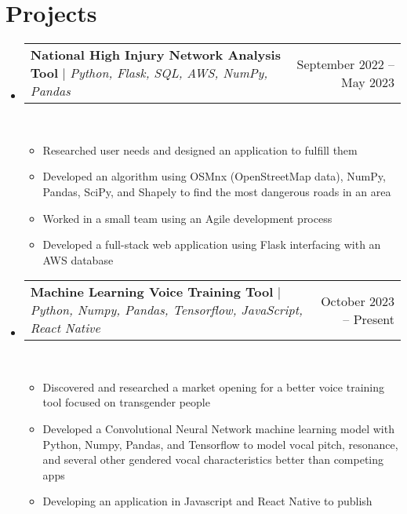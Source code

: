 \documentclass[a4paper,10pt]{article}
\makeatletter
\newcommand{\resumeItem}[1]{
  \item\small{
    {#1\vspace{-2pt}}
  }
}
\newcommand{\resumeProjectHeading}[2]{
    \item
    \begin{tabular*}{0.97\textwidth}{l@{\extracolsep{\fill}}r}
      \small#1 & #2 \\
    \end{tabular*}\vspace{-7pt}
}
\newcommand{\resumeSubHeadingListStart}{\begin{itemize}[leftmargin=0.15in, label={}]}
\newcommand{\resumeSubHeadingListEnd}{\end{itemize}}
\newcommand{\resumeItemListStart}{\begin{itemize}}
\newcommand{\resumeItemListEnd}{\end{itemize}\vspace{-5pt}}
\makeatother
\begin{document}
\section{Projects}
    \resumeSubHeadingListStart
      \resumeProjectHeading
          {\textbf{National High Injury Network Analysis Tool} $|$ \emph{Python, Flask, SQL, AWS, NumPy, Pandas}}{September 2022 -- May 2023}\\
          \resumeItemListStart
            \resumeItem{Researched user needs and designed an application to fulfill them}
            \resumeItem{Developed an algorithm using OSMnx (OpenStreetMap data), NumPy, Pandas, SciPy, and Shapely to find the most dangerous roads in an area}
            \resumeItem{Worked in a small team using an Agile development process}
            \resumeItem{Developed a full-stack web application using Flask interfacing with an AWS database}
          \resumeItemListEnd
      \resumeProjectHeading
          {\textbf{Machine Learning Voice Training Tool} $|$ \emph{Python, Numpy, Pandas, Tensorflow, JavaScript, React Native}}{October 2023 -- Present}\\
          \resumeItemListStart
            \resumeItem{Discovered and researched a market opening for a better voice training tool focused on transgender people}
            \resumeItem{Developed a Convolutional Neural Network machine learning model with Python, Numpy, Pandas, and Tensorflow to model vocal pitch, resonance, and several other gendered vocal characteristics better than competing apps}
            \resumeItem{Developing an application in Javascript and React Native to publish}
          \resumeItemListEnd


    \resumeSubHeadingListEnd
\end{document}
